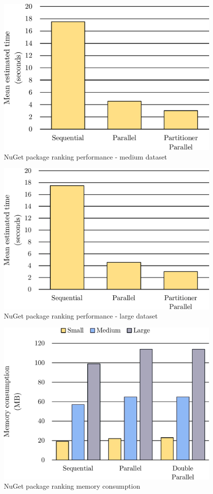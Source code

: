 \begin{figure}[htb]
\centering
\includegraphics[width=.62\linewidth]{figures04/NugetMedium.pdf}
\caption{NuGet package ranking performance - medium dataset}
\label{fig:NugetPerfMed}
\end{figure}
\begin{figure}[htb]
\centering
\includegraphics[width=.62\linewidth]{figures04/NugetLarge.pdf}
\caption{NuGet package ranking performance - large dataset}
\label{fig:NugetPerfLarge}
\end{figure}
\begin{figure}[htb]
\centering
\includegraphics[width=.62\linewidth]{figures04/NugetMemory.pdf}
\caption{NuGet package ranking memory consumption}
\label{fig:NugetMemory}
\end{figure}

